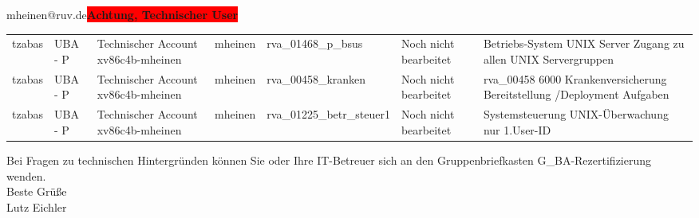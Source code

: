 \documentclass[a4paper,landscape,12pt]{letter}
\begin{document}
\begin{letter}{mheinen@ruv.de\space\space\space\space\space\space\space\space\space\bfseries\colorbox{red}{Achtung, Technischer User}\hfill \break}
\begin{tiny}
\begin{longtable}{|p{35mm}|p{15mm}|p{25mm}|p{10mm}|p{40mm}|p{50mm}|p{50mm}|}
tzabas & UBA - P & Technischer Account xv86c4b-mheinen & mheinen & rva\_01468\_p\_bsus & Noch nicht bearbeitet & Betriebs-System UNIX Server Zugang zu allen UNIX Servergruppen \\
tzabas & UBA - P & Technischer Account xv86c4b-mheinen & mheinen & rva\_00458\_kranken & Noch nicht bearbeitet & rva\_00458 6000 Krankenversicherung Bereitstellung /Deployment Aufgaben \\
tzabas & UBA - P & Technischer Account xv86c4b-mheinen & mheinen & rva\_01225\_betr\_steuer1 & Noch nicht bearbeitet & Systemsteuerung UNIX-Überwachung nur 1.User-ID \\

\hline
		\end{longtable}
		\end{tiny}
	
\begin{minipage}{\textwidth}
			Bei Fragen zu technischen Hintergründen können Sie 
			oder Ihre IT-Betreuer sich an den Gruppenbriefkasten 
			G\_BA-Rezertifizierung
			wenden.\\
			\linebreak
			Beste Grüße\\
			Lutz Eichler
	\end{minipage}
	\end{letter}
	
\end{document}

